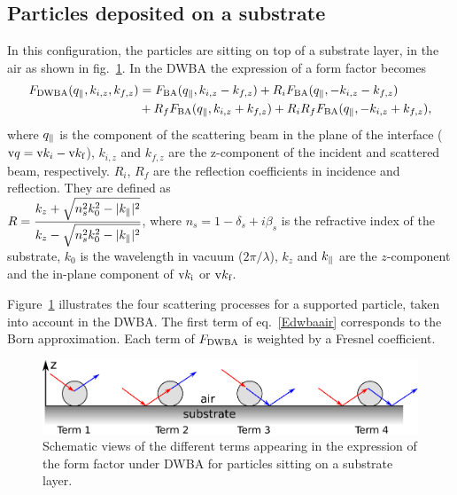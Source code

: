 \subsection{Particles deposited on a substrate}
In this configuration, the particles are sitting on top of a substrate layer, in the air as shown in fig.~\ref{fig:SchemDWBA}. In the DWBA the expression of a form factor becomes
\begin{align}
F_{\rm{DWBA}}(q_{\parallel}, k_{i,z}, k_{f,z}) &= F_{\rm{BA}}(q_{\parallel}, k_{i,z}-k_{f,z})+ R_i F_{\rm{BA}}(q_{\parallel}, -k_{i,z}-k_{f,z}) \nonumber \\
&+ R_f F_{\rm{BA}}(q_{\parallel}, k_{i,z}+k_{f,z}) + R_i R_f F_{\rm{BA}}(q_{\parallel},-k_{i,z}+k_{f,z}), \label{Edwbaair}
\end{align}
where $q_{\parallel}$ is the component of the scattering beam in the plane of the interface ($\text{v}{q}=\text{v}{k}_i-\text{v}{k}_\text{f}$), $k_{i,z}$ and $k_{f,z}$ are the z-component of the incident and scattered beam, respectively. $R_i$, $R_f$ are the reflection coefficients in incidence and reflection. They are defined as\\ $R=\dfrac{k_z+\sqrt{n_s^2k_0^2-|k_{\parallel}|^2}}{k_z-\sqrt{n_s^2 k_0^2-|k_{\parallel}|^2}}$, where $n_s=1-\delta_s +i \beta_s$ is the refractive index of the substrate, $k_0$ is the wavelength in vacuum ($2\pi /\lambda$), $k_z$ and $k_{\parallel}$ are the $z$-component and the in-plane component of $\text{v}{k}_\text{i}$ or $\text{v}{k}_\text{f}$. \\


\vspace{18pt}

Figure~\ref{fig:SchemDWBA} illustrates the four scattering processes for a supported particle, taken into account in the DWBA. The first term of eq.~\ref{Edwbaair}  corresponds to the Born approximation. Each term of $F_{\rm{DWBA}}$ is weighted by a Fresnel coefficient.

\begin{figure}[tb]
\begin{center}
\includegraphics[width=\textwidth]{fig/drawing/drawingDWBA.pdf}
\end{center}
\caption{Schematic views of the different terms appearing in the expression of the form factor under DWBA for particles sitting on a substrate layer.}
\label{fig:SchemDWBA}
\end{figure}


